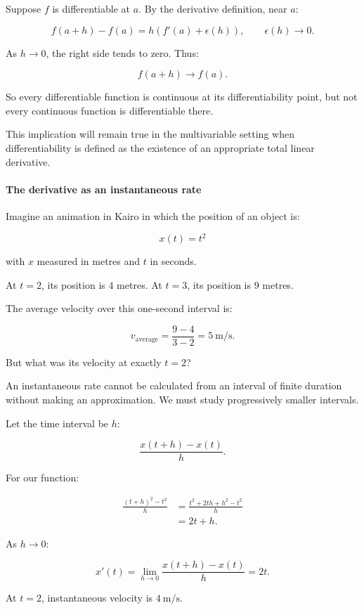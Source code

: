 Suppose \(f\) is differentiable at \(a\). By the derivative definition, near \(a\):

\[
f(a+h)-f(a) = h\left(f'(a)+\epsilon(h)\right), \qquad \epsilon(h)\to0.
\]

As \(h\to0\), the right side tends to zero. Thus:

\[
f(a+h)\to f(a).
\]

So every differentiable function is continuous at its differentiability point, but not every continuous function is differentiable there.

This implication will remain true in the multivariable setting when differentiability is defined as the existence of an appropriate total linear derivative.

\paragraph{The derivative as an instantaneous rate}\label{01-foundations-i-ch020-the-derivative-as-an-instantaneous-rate}

Imagine an animation in Kairo in which the position of an object is:

\[
x(t)=t^2
\]

with \(x\) measured in metres and \(t\) in seconds.

At \(t=2\), its position is \(4\) metres. At \(t=3\), its position is \(9\) metres.

The average velocity over this one-second interval is:

\[
v_{\text{average}}=\frac{9-4}{3-2}=5\ \text{m/s}.
\]

But what was its velocity at exactly \(t=2\)?

An instantaneous rate cannot be calculated from an interval of finite duration without making an approximation. We must study progressively smaller intervals.

Let the time interval be \(h\):

\[
\frac{x(t+h)-x(t)}{h}.
\]

For our function:

\[
\begin{aligned} \frac{(t+h)^2-t^2}{h} &=\frac{t^2+2th+h^2-t^2}{h}\\ &=2t+h. \end{aligned}
\]

As \(h\to0\):

\[
\boxed{x'(t)=\lim_{h\to0}\frac{x(t+h)-x(t)}h=2t}.
\]

At \(t=2\), instantaneous velocity is \(4\ \text{m/s}\).

